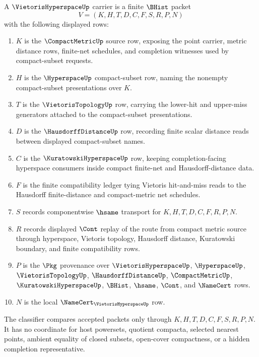 \begin{definition}
\label{def:vietoris-hyperspace-carrier}
A $\VietorisHyperspaceUp$ carrier is a finite $\BHist$ packet
$$
V=(K,H,T,D,C,F,S,R,P,N)
$$
with the following displayed rows:
\begin{enumerate}
\item $K$ is the $\CompactMetricUp$ source row, exposing the point carrier, metric distance rows, finite-net schedules, and completion witnesses used by compact-subset requests.
\item $H$ is the $\HyperspaceUp$ compact-subset row, naming the nonempty compact-subset presentations over $K$.
\item $T$ is the $\VietorisTopologyUp$ row, carrying the lower-hit and upper-miss generators attached to the compact-subset presentations.
\item $D$ is the $\HausdorffDistanceUp$ row, recording finite scalar distance reads between displayed compact-subset names.
\item $C$ is the $\KuratowskiHyperspaceUp$ row, keeping completion-facing hyperspace consumers inside compact finite-net and Hausdorff-distance data.
\item $F$ is the finite compatibility ledger tying Vietoris hit-and-miss reads to the Hausdorff finite-distance and compact-metric net schedules.
\item $S$ records componentwise $\hsame$ transport for $K,H,T,D,C,F,R,P,N$.
\item $R$ records displayed $\Cont$ replay of the route from compact metric source through hyperspace, Vietoris topology, Hausdorff distance, Kuratowski boundary, and finite compatibility rows.
\item $P$ is the $\Pkg$ provenance over $\VietorisHyperspaceUp$, $\HyperspaceUp$, $\VietorisTopologyUp$, $\HausdorffDistanceUp$, $\CompactMetricUp$, $\KuratowskiHyperspaceUp$, $\BHist$, $\hsame$, $\Cont$, and $\NameCert$ rows.
\item $N$ is the local $\NameCert_{\VietorisHyperspaceUp}$ row.
\end{enumerate}
The classifier compares accepted packets only through $K,H,T,D,C,F,S,R,P,N$. It has no coordinate for host powersets, quotient compacta, selected nearest points, ambient equality of closed subsets, open-cover compactness, or a hidden completion representative.
\end{definition}


